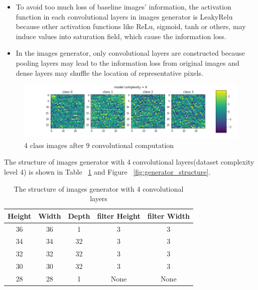 \documentclass{article}
\begin{document}
\begin{itemize}
    \item To avoid too much loss of baseline images' information, the activation function in each convolutional layers in images generator is LeakyRelu because other activation functions like ReLu, sigmoid, tanh or others, may induce values into saturation field, which cause the information loss.
    
    \item In the images generator, only convolutional layers are constructed because pooling layers may lead to the information loss from original images and dense layers may shuffle the location of representative pixels.
\end{itemize}

\begin{figure}[h]
    \centering
    \includegraphics[width=1\linewidth]{demo-9.png}
    \caption{\small 4 class images after 9 convolutional computation}
    \label{fig:most_complex_image}
\end{figure}

The structure of images generator with 4 convolutional layers(dataset complexity level 4) is shown in Table ~\ref{table:generator_structure} and Figure ~\ref{fig:generator_structure}.

\begin{table}
\begin{center}
\begin{tabular}{ |c|c|c|c|c| } 
\hline
Height & Width & Depth & filter Height & filter Width \\
\hline
36 & 36 & 1 & 3 & 3 \\ 
\hline
34 & 34 & 32 & 3 & 3 \\ 
\hline
32 & 32 & 32 & 3 & 3 \\ 
\hline
30 & 30 & 32 & 3 & 3 \\ 
\hline
28 & 28 & 1 & None & None \\ 
\hline
\end{tabular}
\end{center}
\caption{The structure of images generator with 4 convolutional layers}
\label{table:generator_structure}
\end{table}
\end{document}
